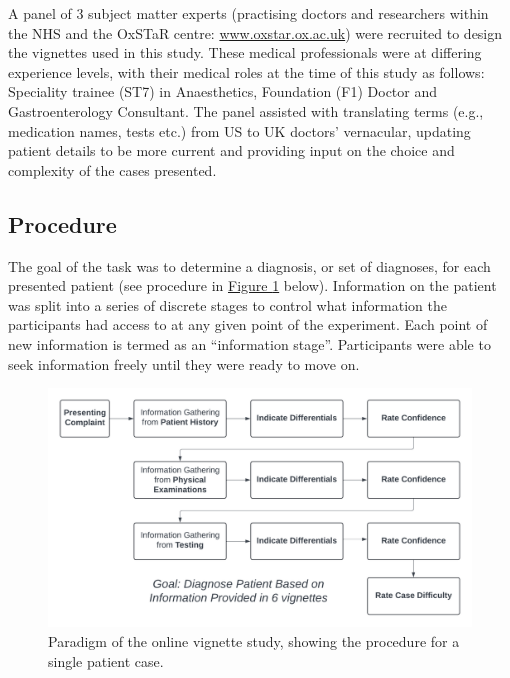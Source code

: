 \documentclass[a4paper, nobind]{templates/ociamthesis}
\begin{document}
A panel of 3 subject matter experts (practising doctors and researchers within the NHS and the OxSTaR centre: \url{www.oxstar.ox.ac.uk}) were recruited to design the vignettes used in this study. These medical professionals were at differing experience levels, with their medical roles at the time of this study as follows: Speciality trainee (ST7) in Anaesthetics, Foundation (F1) Doctor and Gastroenterology Consultant. The panel assisted with translating terms (e.g., medication names, tests etc.) from US to UK doctors' vernacular, updating patient details to be more current and providing input on the choice and complexity of the cases presented.

\subsection{Procedure}\label{procedure}

The goal of the task was to determine a diagnosis, or set of diagnoses, for each presented patient (see procedure in \hyperref[fig:paradigm]{Figure \ref{fig:paradigm}} below). Information on the patient was split into a series of discrete stages to control what information the participants had access to at any given point of the experiment. Each point of new information is termed as an ``information stage''. Participants were able to seek information freely until they were ready to move on.\\

\begin{figure}[H]

{\centering \includegraphics[width=1\linewidth]{./assets/Paradigm} 

}

\caption[Online Study: Paradigm]{Paradigm of the online vignette study, showing the procedure for a single patient case.}\label{fig:paradigm}
\end{figure}
\end{document}
